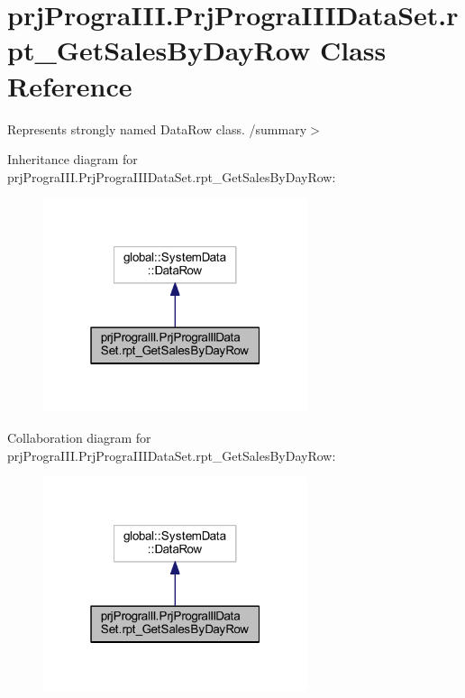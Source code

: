 \hypertarget{classprj_progra_i_i_i_1_1_prj_progra_i_i_i_data_set_1_1rpt___get_sales_by_day_row}{}\section{prj\+Progra\+I\+I\+I.\+Prj\+Progra\+I\+I\+I\+Data\+Set.\+rpt\+\_\+\+Get\+Sales\+By\+Day\+Row Class Reference}
\label{classprj_progra_i_i_i_1_1_prj_progra_i_i_i_data_set_1_1rpt___get_sales_by_day_row}


Represents strongly named Data\+Row class. /summary$>$  




Inheritance diagram for prj\+Progra\+I\+I\+I.\+Prj\+Progra\+I\+I\+I\+Data\+Set.\+rpt\+\_\+\+Get\+Sales\+By\+Day\+Row\+:
\nopagebreak
\begin{figure}[H]
\begin{center}
\leavevmode
\includegraphics[width=220pt]{classprj_progra_i_i_i_1_1_prj_progra_i_i_i_data_set_1_1rpt___get_sales_by_day_row__inherit__graph}
\end{center}
\end{figure}


Collaboration diagram for prj\+Progra\+I\+I\+I.\+Prj\+Progra\+I\+I\+I\+Data\+Set.\+rpt\+\_\+\+Get\+Sales\+By\+Day\+Row\+:
\nopagebreak
\begin{figure}[H]
\begin{center}
\leavevmode
\includegraphics[width=220pt]{classprj_progra_i_i_i_1_1_prj_progra_i_i_i_data_set_1_1rpt___get_sales_by_day_row__coll__graph}
\end{center}
\end{figure}
